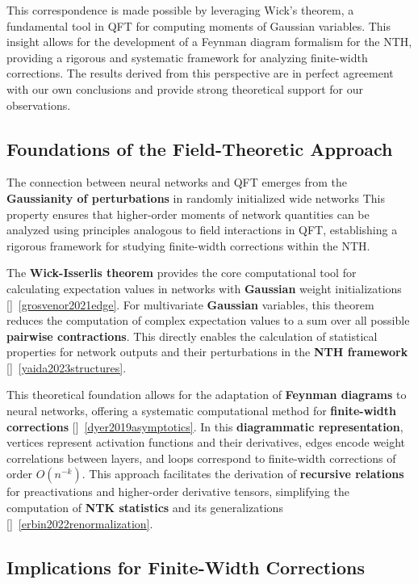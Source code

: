 This correspondence is made possible by leveraging Wick's theorem, a fundamental tool in QFT for computing moments of Gaussian variables. This insight allows for the development of a Feynman diagram formalism for the NTH, providing a rigorous and systematic framework for analyzing finite-width corrections. The results derived from this perspective are in perfect agreement with our own conclusions and provide strong theoretical support for our observations.

\subsection{Foundations of the Field-Theoretic Approach}

The connection between neural networks and QFT emerges from the \textbf{Gaussianity of perturbations} in randomly initialized wide networks This property ensures that higher-order moments of network quantities can be analyzed using principles analogous to field interactions in QFT, establishing a rigorous framework for studying finite-width corrections within the NTH.

The \textbf{Wick-Isserlis theorem} provides the core computational tool for calculating expectation values in networks with \textbf{Gaussian} weight initializations []~\ref{grosvenor2021edge}. For multivariate \textbf{Gaussian} variables, this theorem reduces the computation of complex expectation values to a sum over all possible \textbf{pairwise contractions}. This directly enables the calculation of statistical properties for network outputs and their perturbations in the \textbf{NTH framework} []~\ref{yaida2023structures}.

This theoretical foundation allows for the adaptation of \textbf{Feynman diagrams} to neural networks, offering a systematic computational method for \textbf{finite-width corrections} []~\ref{dyer2019asymptotics}. In this \textbf{diagrammatic representation}, vertices represent activation functions and their derivatives, edges encode weight correlations between layers, and loops correspond to finite-width corrections of order $O(n^{-k})$. This approach facilitates the derivation of \textbf{recursive relations} for preactivations and higher-order derivative tensors, simplifying the computation of \textbf{NTK statistics} and its generalizations []~\ref{erbin2022renormalization}.

\subsection{Implications for Finite-Width Corrections}


